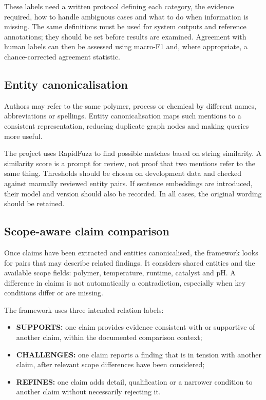 \documentclass[11pt,a4paper]{article}
\begin{document}
These labels need a written protocol defining each category, the evidence required, how to handle ambiguous cases and what to do when information is missing. The same definitions must be used for system outputs and reference annotations; they should be set before results are examined. Agreement with human labels can then be assessed using macro-F1 and, where appropriate, a chance-corrected agreement statistic.

\subsection{Entity canonicalisation}

Authors may refer to the same polymer, process or chemical by different names, abbreviations or spellings. Entity canonicalisation maps such mentions to a consistent representation, reducing duplicate graph nodes and making queries more useful.

The project uses RapidFuzz to find possible matches based on string similarity. A similarity score is a prompt for review, not proof that two mentions refer to the same thing. Thresholds should be chosen on development data and checked against manually reviewed entity pairs. If sentence embeddings are introduced, their model and version should also be recorded. In all cases, the original wording should be retained.

\subsection{Scope-aware claim comparison}

Once claims have been extracted and entities canonicalised, the framework looks for pairs that may describe related findings. It considers shared entities and the available scope fields: polymer, temperature, runtime, catalyst and pH. A difference in claims is not automatically a contradiction, especially when key conditions differ or are missing.

The framework uses three intended relation labels:
\begin{itemize}[leftmargin=*]
  \item \textbf{SUPPORTS:} one claim provides evidence consistent with or supportive of another claim, within the documented comparison context;
  \item \textbf{CHALLENGES:} one claim reports a finding that is in tension with another claim, after relevant scope differences have been considered;
  \item \textbf{REFINES:} one claim adds detail, qualification or a narrower condition to another claim without necessarily rejecting it.
\end{itemize}
\end{document}
